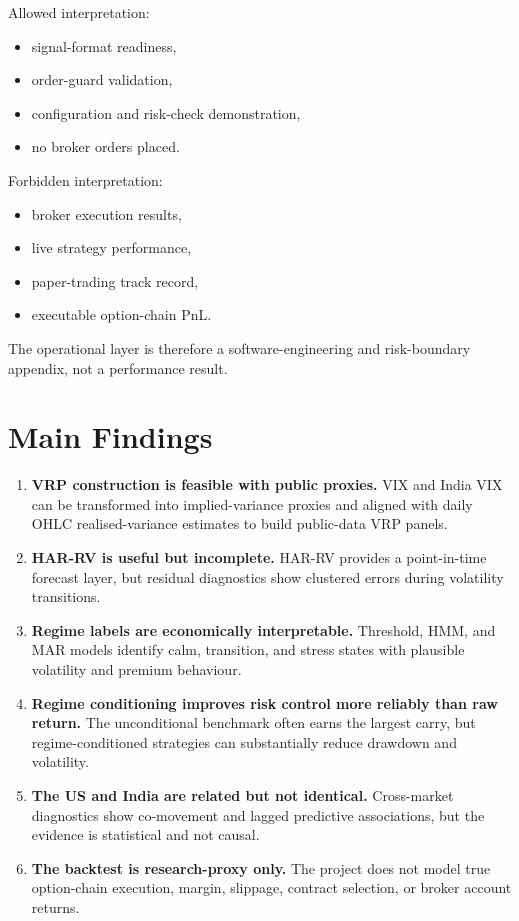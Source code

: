 \documentclass[11pt,a4paper]{article}
\begin{document}
Allowed interpretation:

\begin{itemize}
    \item signal-format readiness,
    \item order-guard validation,
    \item configuration and risk-check demonstration,
    \item no broker orders placed.
\end{itemize}

Forbidden interpretation:

\begin{itemize}
    \item broker execution results,
    \item live strategy performance,
    \item paper-trading track record,
    \item executable option-chain PnL.
\end{itemize}

The operational layer is therefore a software-engineering and risk-boundary appendix, not a performance result.

\section{Main Findings}

\begin{enumerate}
    \item \textbf{VRP construction is feasible with public proxies.} VIX and India VIX can be transformed into implied-variance proxies and aligned with daily OHLC realised-variance estimates to build public-data VRP panels.
    \item \textbf{HAR-RV is useful but incomplete.} HAR-RV provides a point-in-time forecast layer, but residual diagnostics show clustered errors during volatility transitions.
    \item \textbf{Regime labels are economically interpretable.} Threshold, HMM, and MAR models identify calm, transition, and stress states with plausible volatility and premium behaviour.
    \item \textbf{Regime conditioning improves risk control more reliably than raw return.} The unconditional benchmark often earns the largest carry, but regime-conditioned strategies can substantially reduce drawdown and volatility.
    \item \textbf{The US and India are related but not identical.} Cross-market diagnostics show co-movement and lagged predictive associations, but the evidence is statistical and not causal.
    \item \textbf{The backtest is research-proxy only.} The project does not model true option-chain execution, margin, slippage, contract selection, or broker account returns.
\end{enumerate}
\end{document}
